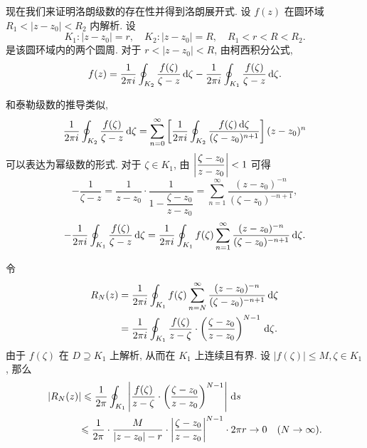 现在我们来证明洛朗级数的存在性并得到洛朗展开式.
设 $f(z)$ 在圆环域 $R_1<|z-z_0|<R_2$ 内解析.
设
	\[K_1:|z-z_0|=r,\quad K_2:|z-z_0|=R,\quad R_1<r<R<R_2.\]
是该圆环域内的两个圆周. 
对于 $r<|z-z_0|<R$, 由柯西积分公式,
\[f(z)=\frac1{2\pi i}
	\oint_{K_2}\frac{f(\zeta)}{\zeta-z}\,\mathrm{d}\zeta
	-\frac1{2\pi i}\oint_{K_1}\frac{f(\zeta)}{\zeta-z}\,\mathrm{d}\zeta.\]

\begin{center}
\end{center}

和泰勒级数的推导类似,
	\[\frac1{2\pi i}\oint_{K_2}\frac{f(\zeta)}{\zeta-z}\,\mathrm{d}\zeta
	=\sum_{n=0}^\infty\left[\frac1{2\pi i}\oint_{K_2}\frac{f(\zeta)\,\mathrm{d}\zeta}{(\zeta-z_0)^{n+1}}\right](z-z_0)^n\]
可以表达为幂级数的形式.
对于 $\zeta\in K_1$, 由 $\left|\dfrac{\zeta-z_0}{z-z_0}\right|<1$ 可得
	\[-\frac1{\zeta-z}=\frac1{z-z_0}\cdot\frac1{1-\dfrac{\zeta-z_0}{z-z_0}}=\sum_{n=1}^\infty\frac{(z-z_0)^{-n}}{(\zeta-z_0)^{-n+1}},\]
	\[-\frac1{2\pi i}\oint_{K_1}\frac{f(\zeta)}{\zeta-z}\,\mathrm{d}\zeta=\frac1{2\pi i}\oint_{K_1}f(\zeta)\sum_{n=1}^\infty\frac{(z-z_0)^{-n}}{(\zeta-z_0)^{-n+1}}\,\mathrm{d}\zeta.\]

令
\begin{align*}
	R_N(z)&=\frac1{2\pi i}\oint_{K_1}f(\zeta)\sum_{n=N}^\infty\frac{(z-z_0)^{-n}}{(\zeta-z_0)^{-n+1}}\,\mathrm{d}\zeta\\
	&=\frac1{2\pi i}\oint_{K_1}\frac{f(\zeta)}{z-\zeta}\cdot\left(\frac{\zeta-z_0}{z-z_0}\right)^{N-1}\,\mathrm{d}\zeta.
\end{align*}
由于 $f(\zeta)$ 在 $D\supseteq K_1$ 上解析, 从而在 $K_1$ 上连续且有界.
设 $|f(\zeta)|\le M,\zeta\in K_1$,
那么
\begin{align*}
|R_N(z)|&\leqslant\frac 1{2\pi}\oint_{K_1}\left|\frac{f(\zeta)}{z-\zeta}\cdot\left(\frac{\zeta-z_0}{z-z_0}\right)^{N-1}\right|\,\mathrm{d} s\\
&{\leqslant\frac 1{2\pi}\cdot\frac M{|z-z_0|-r}\cdot\left|\frac{\zeta-z_0}{z-z_0}\right|^{N-1}\cdot 2\pi r\to 0\quad (N\to\infty).}
\end{align*}

